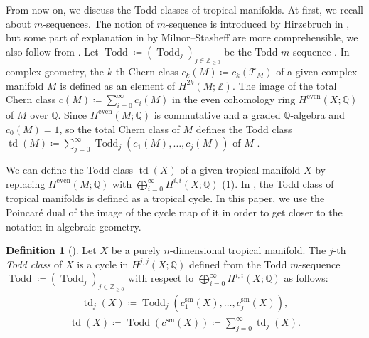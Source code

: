 \documentclass[a4paper,dvipdfmx,reqno,12pt]{amsart}
\theoremstyle{definition}
\newtheorem{definition}[theorem]{Definition}
\newcommand{\deq}{\coloneqq}
\newcommand{\opn}[1]{\operatorname{#1}}
\numberwithin{equation}{section}
\begin{document}
From now on, we discuss the Todd classes of
tropical manifolds.
At first, we recall about $m$-sequences.
The notion of $m$-sequence is introduced
by Hirzebruch in \cite[]{MR1335917},
but some part of explanation in
\cite[]{MR440554}
by Milnor--Stasheff are more comprehensible,
we also follow from \cite[]{MR440554}.
Let $\opn{Todd}\deq 
(\opn{Todd}_j)_{j\in \mathbb{Z}_{\geq 0}}$ be 
the Todd $m$-sequence \cite[]{MR1335917}.
In complex geometry, the $k$-th Chern class
$c_k(M)\deq c_k(\mathcal{T}_M)$ of
a given complex manifold $M$ is defined
as an element of $H^{2k}(M;\mathbb{Z})$.
The image of the total Chern class 
$c(M)\deq \sum_{i=0}^{\infty}c_i(M)$
in the even cohomology ring $H^{\mathrm{even}}(X;\mathbb{Q})$
of $M$ over $\mathbb{Q}$.
Since $H^{\mathrm{even}}(M;\mathbb{Q})$
is commutative and a graded $\mathbb{Q}$-algebra
and $c_0(M)=1$,
so the total Chern class of $M$ defines 
the Todd class $\opn{td}(M)\deq \sum_{j=0}^{\infty}
\opn{Todd}_j(c_{1}(M),\ldots,c_{j}(M))$ of $M$
\cite[]{MR1335917}.
 
We can define the Todd class
$\opn{td}(X)$ of a given tropical manifold
$X$ by replacing 
$H^{\mathrm{even}}(M;\mathbb{Q})$ with
$\bigoplus_{i=0}^{\infty} H^{i,i}(X;\mathbb{Q})$
(\cref{definition-tropical-todd}).
In \cite[Conjecture 6.13]{demedrano2023chern},
the Todd class of tropical manifolds is
defined as a tropical cycle.
In this paper, we use the Poincar\'e dual of the image 
of the cycle map of it
in order to get closer to the notation 
in algebraic geometry.

\begin{definition}[{\cite[]{demedrano2023chern}}]
\label{definition-tropical-todd}
Let $X$ be a purely $n$-dimensional tropical manifold.
The $j$-th \emph{Todd class} of $X$ is
a cycle in $H^{j,j}(X;\mathbb{Q})$
defined from 
the Todd $m$-sequence 
$\opn{Todd}\deq (\opn{Todd}_j)_{j\in \mathbb{Z}_{\geq 0}}$
with respect to $\bigoplus_{i=0}^{\infty}
H^{i,i}(X;\mathbb{Q})$ as follows:
\begin{align}
\opn{td}_j(X)\deq \opn{Todd}_j(c_{1}^{\mathrm{sm}}(X),
\ldots,c_{j}^{\mathrm{sm}}(X)),
\end{align}
\begin{align}
\opn{td}(X)\deq
\opn{Todd}(c^{\mathrm{sm}}(X))\deq
\sum_{j=0}^{\infty}\opn{td}_j(X).
\end{align}

\end{definition}
\end{document}
